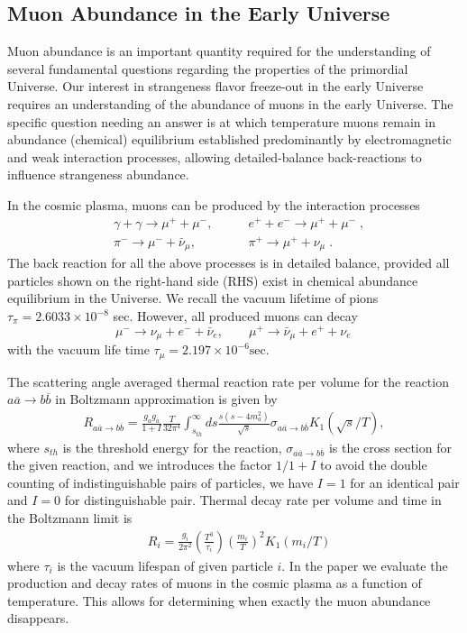 \documentclass[universe,article,submit,moreauthors,pdftex,a4paper]{Definitions/mdpi}
\begin{document}
\subsection{Muon Abundance in the Early Universe} \label{sec:Muons}
\noindent Muon abundance is an important quantity required for the understanding of several fundamental questions regarding the properties of the primordial Universe. Our interest in strangeness flavor freeze-out in the early Universe \cite{Yang:2021bko} requires an understanding of the abundance of muons in the early Universe. The specific question needing an answer is at which temperature muons remain in abundance (chemical) equilibrium established predominantly by electromagnetic and weak interaction processes, allowing detailed-balance back-reactions to influence strangeness abundance.

In the cosmic plasma, muons can be produced by the interaction processes 
\begin{align} 
&\gamma+\gamma\longrightarrow\mu^++\mu^-,\qquad & e^++e^-\longrightarrow \mu^++\mu^-\;,\\
&\pi^-\longrightarrow\mu^-+\bar{\nu}_\mu,\qquad & \pi^+\longrightarrow\mu^++\nu_\mu\;.
\end{align}
The back reaction for all the above processes is in detailed balance, provided all particles shown on the right-hand side (RHS) exist in chemical abundance equilibrium in the Universe. We recall the vacuum lifetime of pions $\tau_\pi=2.6033\times10^{-8}$ sec. 
However, all produced muons can decay 
\begin{equation}
\mu^-\rightarrow\nu_\mu+e^-+\bar{\nu}_e,\qquad \mu^+\rightarrow\bar{\nu}_\mu+e^++\nu_e\,
\end{equation} 
with the vacuum life time $\tau_{\mu}=2.197 \times 10^{-6}\mathrm{sec}$. 

The scattering angle averaged thermal reaction rate per volume for the reaction $a\overline{a}\rightarrow b\overline{b}$ in Boltzmann approximation is given by \cite{Letessier:2002gp}
\begin{align}\label{pairR}
R_{a\overline{a}\rightarrow b\overline{b}}=\frac{g_ag_{\overline{a}}}{1+I}\frac{T}{32\pi^4}\int_{s_{th}}^\infty ds\frac{s(s-4m^2_a)}{\sqrt{s}}\sigma_{a\overline{a}\rightarrow b\overline{b}} K_1(\sqrt{s}/T),
\end{align}
where $s_{th}$ is the threshold energy for the reaction, $\sigma_{a\overline{a}\rightarrow b\overline{b}}$ is the cross section for the given reaction, and we introduces the factor $1/1+I$ to avoid the double counting of indistinguishable pairs of particles, we have $I=1$ for an identical pair and $I=0$ for distinguishable pair.
Thermal decay rate per volume and time in the Boltzmann limit is~\cite{Kuznetsova:2008jt}
\begin{align}
&R_i=\frac{g_i}{2\pi^2}\left(\frac{T^3}{\tau_i}\right)\left(\frac{m_i}{T}\right)^2K_1(m_i/T) 
\end{align}
where $\tau_i$ is the vacuum lifespan of given particle $i$. In the paper \cite{Rafelski:2021aey} we evaluate the production and decay rates of muons in the cosmic plasma as a function of temperature. This allows for determining when exactly the muon abundance disappears. 
\end{document}
